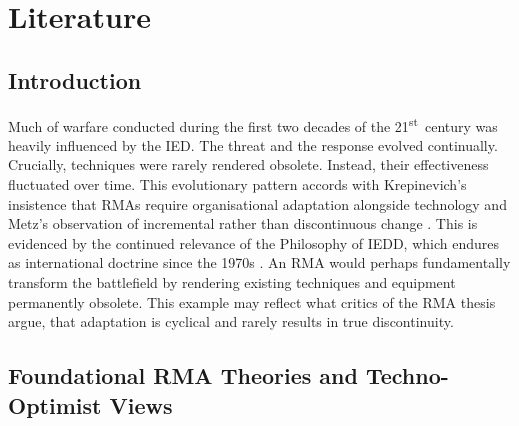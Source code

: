 \chapter{Literature}

\section{Introduction}Much of warfare conducted during the first two decades of the 21\textsuperscript{st}~century was heavily influenced by the IED. The threat and the response evolved continually. Crucially, techniques were rarely rendered obsolete. Instead, their effectiveness fluctuated over time. This evolutionary pattern accords with Krepinevich’s insistence that RMAs require organisational adaptation alongside technology \parencite{KREP_1992} and Metz’s observation of incremental rather than discontinuous change \parencite{METZ_2000,KREPINEVICH_1994}. This is evidenced by the continued relevance of the Philosophy of IEDD, which endures as international doctrine since the 1970s  \parencite{COCHRANE_2012,DORD_2022}. An RMA would perhaps fundamentally transform the battlefield by rendering existing techniques and equipment permanently obsolete. This example may reflect what critics of the RMA thesis argue, that adaptation is cyclical and rarely results in true discontinuity. %

 

\section{Foundational RMA Theories and Techno-Optimist Views}


